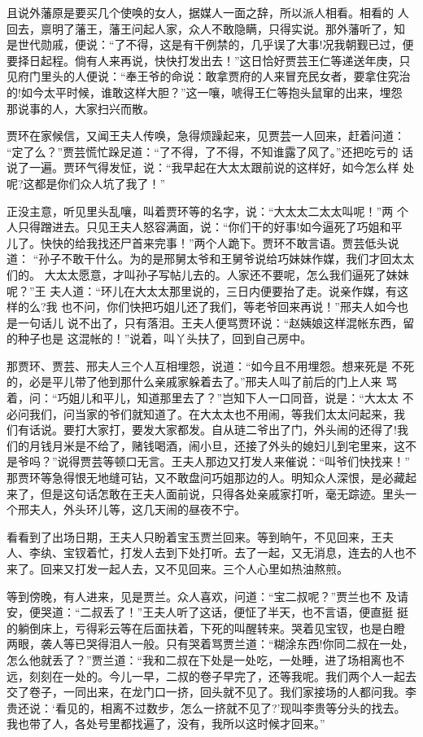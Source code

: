 且说外藩原是要买几个使唤的女人，据媒人一面之辞，所以派人相看。相看的
人回去，禀明了藩王，藩王问起人家，众人不敢隐瞒，只得实说。那外藩听了，知
是世代勋戚，便说：“了不得，这是有干例禁的，几乎误了大事!况我朝觐已过，便
要择日起程。倘有人来再说，快快打发出去！”这日恰好贾芸王仁等递送年庚，只
见府门里头的人便说：“奉王爷的命说：敢拿贾府的人来冒充民女者，要拿住究治
的!如今太平时候，谁敢这样大胆？”这一嚷，唬得王仁等抱头鼠窜的出来，埋怨
那说事的人，大家扫兴而散。

贾环在家候信，又闻王夫人传唤，急得烦躁起来，见贾芸一人回来，赶着问道：
“定了么？”贾芸慌忙跺足道：“了不得，了不得，不知谁露了风了。”还把吃亏的
话说了一遍。贾环气得发怔，说：“我早起在大太太跟前说的这样好，如今怎么样
处呢?这都是你们众人坑了我了！”

正没主意，听见里头乱嚷，叫着贾环等的名字，说：“大太太二太太叫呢！”两
个人只得蹭进去。只见王夫人怒容满面，说：“你们干的好事!如今逼死了巧姐和平
儿了。快快的给我找还尸首来完事！”两个人跪下。贾环不敢言语。贾芸低头说道：
“孙子不敢干什么。为的是邢舅太爷和王舅爷说给巧妹妹作媒，我们才回太太们的。
大太太愿意，才叫孙子写帖儿去的。人家还不要呢，怎么我们逼死了妹妹呢？”王
夫人道：“环儿在大太太那里说的，三日内便要抬了走。说亲作媒，有这样的么?我
也不问，你们快把巧姐儿还了我们，等老爷回来再说！”邢夫人如今也是一句话儿
说不出了，只有落泪。王夫人便骂贾环说：“赵姨娘这样混帐东西，留的种子也是
这混帐的！”说着，叫丫头扶了，回到自己房中。

那贾环、贾芸、邢夫人三个人互相埋怨，说道：“如今且不用埋怨。想来死是
不死的，必是平儿带了他到那什么亲戚家躲着去了。”邢夫人叫了前后的门上人来
骂着，问：“巧姐儿和平儿，知道那里去了？”岂知下人一口同音，说是：“大太太
不必问我们，问当家的爷们就知道了。在大太太也不用闹，等我们太太问起来，我
们有话说。要打大家打，要发大家都发。自从琏二爷出了门，外头闹的还得了!我
们的月钱月米是不给了，赌钱喝酒，闹小旦，还接了外头的媳妇儿到宅里来，这不
是爷吗？”说得贾芸等顿口无言。王夫人那边又打发人来催说：“叫爷们快找来！”
那贾环等急得恨无地缝可钻，又不敢盘问巧姐那边的人。明知众人深恨，是必藏起
来了，但是这句话怎敢在王夫人面前说，只得各处亲戚家打听，毫无踪迹。里头一
个邢夫人，外头环儿等，这几天闹的昼夜不宁。

看看到了出场日期，王夫人只盼着宝玉贾兰回来。等到晌午，不见回来，王夫
人、李纨、宝钗着忙，打发人去到下处打听。去了一起，又无消息，连去的人也不
来了。回来又打发一起人去，又不见回来。三个人心里如热油熬煎。

等到傍晚，有人进来，见是贾兰。众人喜欢，问道：“宝二叔呢？”贾兰也不
及请安，便哭道：“二叔丢了！”王夫人听了这话，便怔了半天，也不言语，便直挺
挺的躺倒床上，亏得彩云等在后面扶着，下死的叫醒转来。哭着见宝钗，也是白瞪
两眼，袭人等已哭得泪人一般。只有哭着骂贾兰道：“糊涂东西!你同二叔在一处，
怎么他就丢了？”贾兰道：“我和二叔在下处是一处吃，一处睡，进了场相离也不
远，刻刻在一处的。今儿一早，二叔的卷子早完了，还等我呢。我们两个人一起去
交了卷子，一同出来，在龙门口一挤，回头就不见了。我们家接场的人都问我。李
贵还说：‘看见的，相离不过数步，怎么一挤就不见了?’现叫李贵等分头的找去。
我也带了人，各处号里都找遍了，没有，我所以这时候才回来。”

